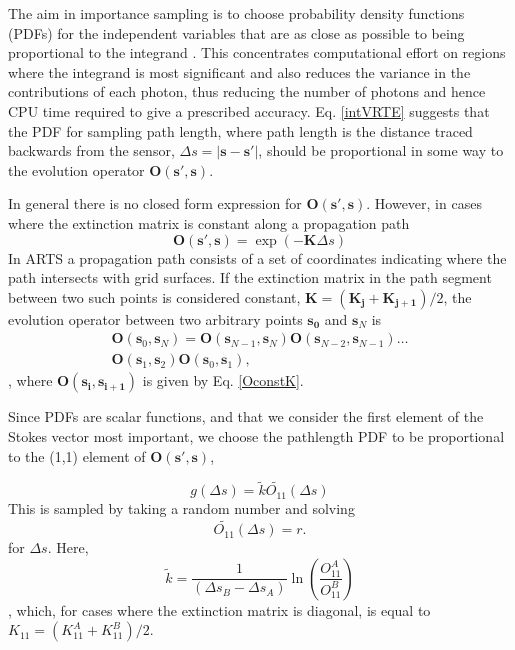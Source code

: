 The aim in importance sampling is to choose probability density functions
(PDFs) for the independent variables that are
as close as possible to being proportional to the integrand
\cite{liu:01}. This concentrates computational effort on regions where
the integrand is most significant and also reduces the variance in the contributions of each photon, thus reducing
the number of photons and hence CPU time required to give a
prescribed accuracy.  Eq. \ref{intVRTE} suggests that the PDF for
sampling path length, where path length is the distance traced backwards
from the sensor, $\Delta s=\left|\mathbf{s}-\mathbf{s'}\right|$, should be proportional in some way to the evolution
operator $\mathbf{O(s',s)}$. 

In general there is no closed form expression for $\mathbf{O(s',s)}$.
However, in cases where the extinction matrix is constant along a
propagation path
\begin{equation}
\mathbf{O(s',s)}=\exp\left(-\mathbf{K}\Delta s\right)
\label{OconstK}
\end{equation}
In ARTS a propagation path consists of a set of coordinates
indicating where the path intersects with grid surfaces.  If the
extinction matrix in the path segment between two such points is
considered constant, $\mathbf{K}=(\mathbf{K_j}+\mathbf{K_{j+1}})/2$,
the evolution operator between two arbitrary points $\mathbf{s_0}$ and
$\mathbf{s}_N$ is
\begin{eqnarray}
\mathbf{O}(\mathbf{s}_0,\mathbf{s}_N) =
\mathbf{O}(\mathbf{s}_{N-1},\mathbf{s}_N)
\mathbf{O}(\mathbf{s}_{N-2},\mathbf{s}_{N-1}) \dots \nonumber\\
\mathbf{O}(\mathbf{s}_1,\mathbf{s}_2)\mathbf{O}(\mathbf{s}_0,\mathbf{s}_1),
\label{Ogeneral}
\end{eqnarray}
, where $\mathbf{O(s_i,s_{i+1})}$ is given by Eq. \ref{OconstK}.

Since PDFs are scalar functions, and that we consider the first element of the
Stokes vector most important, we choose the pathlength PDF to be proportional to the
(1,1) element of $\mathbf{O(s',s)}$,

\begin{equation}
g(\Delta s)=\tilde{k}\tilde{O_{11}}(\Delta s)
\label{gDeltas}
\end{equation}
This is sampled by taking a random number and solving 
\begin{equation}
\tilde{O_{11}}(\Delta s)=r.
\label{solvefor0}
\end{equation}
for $\Delta s$.  Here, 
\begin{equation}
\tilde{k}=\frac{1}{\left(\Delta s_B-\Delta s_A\right)}
\ln\left(\frac{O_{11}^A}{O_{11}^B}\right)
\end{equation}
, which, for cases where the extinction matrix is diagonal, is equal to $K_{11}=(K_{11}^A+K_{11}^B)/2$.


